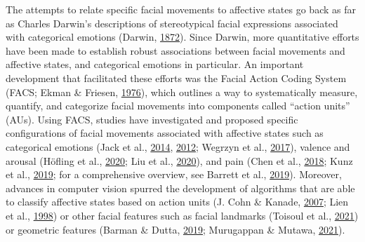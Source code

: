 \documentclass[11pt,american,a4paper,oneside,]{memoir} %
\begin{document}
The attempts to relate specific facial movements to affective states go back as far as Charles Darwin's descriptions of stereotypical facial expressions associated with categorical emotions (Darwin, \protect\hyperlink{ref-Darwin1872-nv}{1872}). Since Darwin, more quantitative efforts have been made to establish robust associations between facial movements and affective states, and categorical emotions in particular. An important development that facilitated these efforts was the Facial Action Coding System (FACS; Ekman \& Friesen, \protect\hyperlink{ref-Ekman1976-hm}{1976}), which outlines a way to systematically measure, quantify, and categorize facial movements into components called ``action units'' (AUs). Using FACS, studies have investigated and proposed specific configurations of facial movements associated with affective states such as categorical emotions (Jack et al., \protect\hyperlink{ref-Jack2014-ku}{2014}, \protect\hyperlink{ref-Jack2012-eq}{2012}; Wegrzyn et al., \protect\hyperlink{ref-Wegrzyn2017-ke}{2017}), valence and arousal (Höfling et al., \protect\hyperlink{ref-Hofling2020-mk}{2020}; Liu et al., \protect\hyperlink{ref-Liu2020-vo}{2020}), and pain (Chen et al., \protect\hyperlink{ref-chen2018distinct}{2018}; Kunz et al., \protect\hyperlink{ref-Kunz2019-uh}{2019}; for a comprehensive overview, see Barrett et al., \protect\hyperlink{ref-Barrett2019-bc}{2019}). Moreover, advances in computer vision spurred the development of algorithms that are able to classify affective states based on action units (J. Cohn \& Kanade, \protect\hyperlink{ref-Cohn2007-xe}{2007}; Lien et al., \protect\hyperlink{ref-Lien1998-bg}{1998}) or other facial features such as facial landmarks (Toisoul et al., \protect\hyperlink{ref-Toisoul2021-yc}{2021}) or geometric features (Barman \& Dutta, \protect\hyperlink{ref-Barman2019-af}{2019}; Murugappan \& Mutawa, \protect\hyperlink{ref-Murugappan2021-yj}{2021}).
\end{document}
